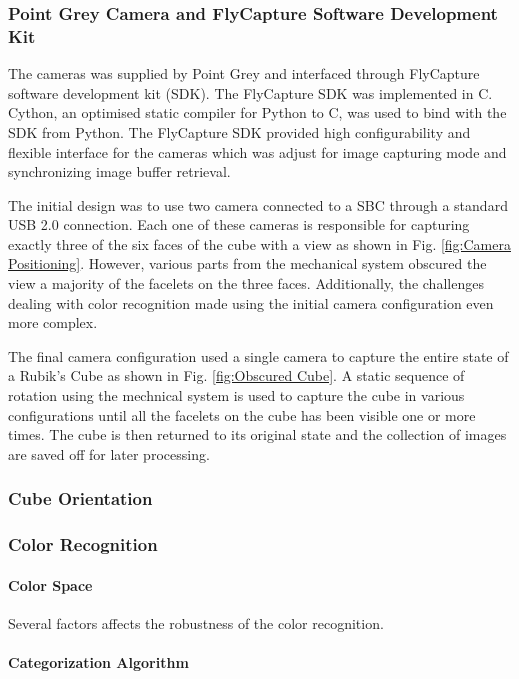 \documentclass[final, letterpaper, 10 pt, conference, twocolumn]{IEEEtran}
\begin{document}
\subsubsection{Point Grey Camera and FlyCapture Software Development Kit}
The cameras was supplied by Point Grey and interfaced through FlyCapture software development kit (SDK). The FlyCapture SDK was implemented in C. Cython, an optimised static compiler for Python to C, was used to bind with the SDK from Python.  The FlyCapture SDK  provided high configurability and flexible interface for the cameras which was adjust for image capturing mode and synchronizing image buffer retrieval. 

The initial design was to use two camera connected to a SBC through a standard USB 2.0 connection. Each one of these cameras is responsible for capturing exactly three of the six faces of the cube with a view as shown in Fig. \ref{fig:Camera Positioning}. However, various parts from the mechanical system obscured the view a majority of the facelets on the three faces. Additionally, the challenges dealing with color recognition made using the initial camera configuration even more complex.

The final camera configuration used a single camera to capture the entire state of a Rubik's Cube as shown in Fig. \ref{fig:Obscured Cube}. A static sequence of rotation using the mechnical system is used to capture the cube in various configurations until all the facelets on the cube has been visible one or more times. The cube is then returned to its original state and the collection of images are saved off for later processing.

\subsubsection{Cube Orientation}
\subsubsection{Color Recognition}
\paragraph{Color Space}
Several factors affects the robustness of the color recognition. 
\paragraph{Categorization Algorithm}
\end{document}
